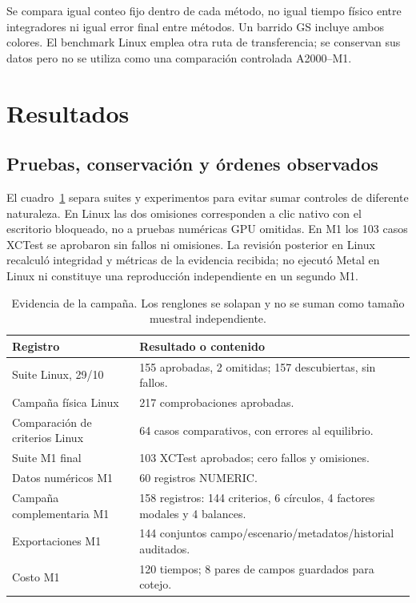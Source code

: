 \documentclass[11pt,a4paper]{article}
\begin{document}
Se compara igual conteo fijo dentro de cada método, no igual tiempo físico entre integradores ni igual error final entre métodos. Un barrido GS incluye ambos colores. El benchmark Linux emplea otra ruta de transferencia; se conservan sus datos pero no se utiliza como una comparación controlada A2000--M1.

\section{Resultados}
\subsection{Pruebas, conservación y órdenes observados}
El cuadro~\ref{tab:counts} separa suites y experimentos para evitar sumar controles de diferente naturaleza. En Linux las dos omisiones corresponden a clic nativo con el escritorio bloqueado, no a pruebas numéricas GPU omitidas. En M1 los 103 casos XCTest se aprobaron sin fallos ni omisiones. La revisión posterior en Linux recalculó integridad y métricas de la evidencia recibida; no ejecutó Metal en Linux ni constituye una reproducción independiente en un segundo M1.

\begin{table}[tbp]\centering\small
\caption{Evidencia de la campaña. Los renglones se solapan y no se suman como tamaño muestral independiente.}\label{tab:counts}
\begin{tabularx}{\linewidth}{@{}lX@{}}\toprule
Registro & Resultado o contenido\\\midrule
Suite Linux, 29/10 & 155 aprobadas, 2 omitidas; 157 descubiertas, sin fallos.\\
Campaña física Linux & 217 comprobaciones aprobadas.\\
Comparación de criterios Linux & 64 casos comparativos, con errores al equilibrio.\\
Suite M1 final & 103 XCTest aprobados; cero fallos y omisiones.\\
Datos numéricos M1 & 60 registros NUMERIC.\\
Campaña complementaria M1 & 158 registros: 144 criterios, 6 círculos, 4 factores modales y 4 balances.\\
Exportaciones M1 & 144 conjuntos campo/escenario/metadatos/historial auditados.\\
Costo M1 & 120 tiempos; 8 pares de campos guardados para cotejo.\\\bottomrule
\end{tabularx}
\end{table}
\end{document}
